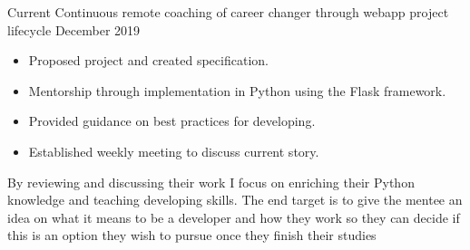 %
%
%

  \begin{experiences}
    \coaching
      {Current}
      {Continuous remote coaching of career changer through webapp project lifecycle}
      {December 2019}
      {
        \begin{itemize}
          \item Proposed project and created specification.
          \item Mentorship through implementation in Python using the Flask framework.
          \item Provided guidance on best practices for developing.
          \item Established weekly meeting to discuss current story.
        \end{itemize}
        {By reviewing and discussing their work I focus on enriching their Python knowledge and teaching developing skills.
        The end target is to give the mentee an idea on what it means to be a developer and how they work
        so they can decide if this is an option they wish to pursue once they finish their studies}
      }
  \end{experiences}